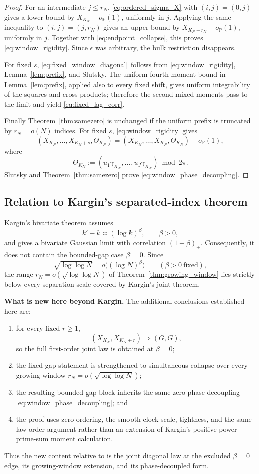 \documentclass[pdflatex,sn-mathphys-num]{sn-jnl}
\numberwithin{equation}{section}
\theoremstyle{thmstyleone}
\theoremstyle{thmstylethree}
\theoremstyle{thmstyletwo}
\newcommand{\1}{\mathbf 1}
\newcommand{\Prob}{\mathbb P}
\begin{document}
\begin{proof}
For an intermediate $j\le r_N$, \eqref{eq:ordered_sigma_X} with $(i,j)=(0,j)$ gives
a lower bound by $X_{K_N}-o_{\Prob}(1)$, uniformly in $j$.  Applying the same inequality
to $(i,j)=(j,r_N)$ gives an upper bound by
$X_{K_N+r_N}+o_{\Prob}(1)$, uniformly in $j$.  Together with
\eqref{eq:endpoint_collapse}, this proves \eqref{eq:window_rigidity}.  Since $\epsilon$
was arbitrary, the bulk restriction disappears.

For fixed $s$, \eqref{eq:fixed_window_diagonal} follows from
\eqref{eq:window_rigidity}, Lemma~\ref{lem:prefix}, and Slutsky.  The uniform fourth
moment bound in Lemma~\ref{lem:prefix}, applied also to every fixed shift, gives uniform
integrability of the squares and cross-products; therefore the second mixed moments pass
to the limit and yield \eqref{eq:fixed_lag_corr}.

Finally Theorem~\ref{thm:samezero} is unchanged if the uniform prefix is truncated by
$r_N=o(N)$ indices.  For fixed $s$, \eqref{eq:window_rigidity} gives
\[
 (X_{K_N},\ldots,X_{K_N+s},\Theta_{K_N})
 =
 (X_{K_N},\ldots,X_{K_N},\Theta_{K_N})+o_{\Prob}(1),
\]
where
\[
 \Theta_{K_N}:=(u_1\gamma_{K_N},\ldots,u_J\gamma_{K_N})\bmod2\pi.
\]
Slutsky and Theorem~\ref{thm:samezero} prove \eqref{eq:window_phase_decoupling}.
\end{proof}

\subsection{Relation to Kargin's separated-index theorem}
\label{subsec:kargin_position}

Kargin's bivariate theorem \cite[Thm.~1.2]{Kargin2013} assumes
\[
 k'-k\asymp(\log k)^\beta,\qquad \beta>0,
\]
and gives a bivariate Gaussian limit with correlation \((1-\beta)_+\).
Consequently, it does not contain the bounded-gap case \(\beta=0\).  Since
\[
 \sqrt{\log\log N}=o\!\bigl((\log N)^\beta\bigr)
 \qquad(\beta>0\ \text{fixed}),
\]
the range \(r_N=o(\sqrt{\log\log N})\) of
Theorem~\ref{thm:growing_window} lies strictly below every separation scale
covered by Kargin's joint theorem.

\medskip\noindent\textbf{What is new here beyond Kargin.}
The additional conclusions established here are:
\begin{enumerate}
\item for every fixed \(r\ge1\),
\[
 (X_{K_N},X_{K_N+r})\Longrightarrow(G,G),
\]
so the full first-order joint law is obtained at \(\beta=0\);
\item the fixed-gap statement is strengthened to simultaneous collapse over
every growing window \(r_N=o(\sqrt{\log\log N})\);
\item the resulting bounded-gap block inherits the same-zero phase
decoupling \eqref{eq:window_phase_decoupling}; and
\item the proof uses zero ordering, the smooth-clock scale, tightness, and
the same-law order argument rather than an extension of Kargin's
positive-power prime-sum moment calculation.
\end{enumerate}
Thus the new content relative to \cite{Kargin2013} is the joint diagonal law
at the excluded \(\beta=0\) edge, its growing-window extension, and its
phase-decoupled form.
\end{document}
